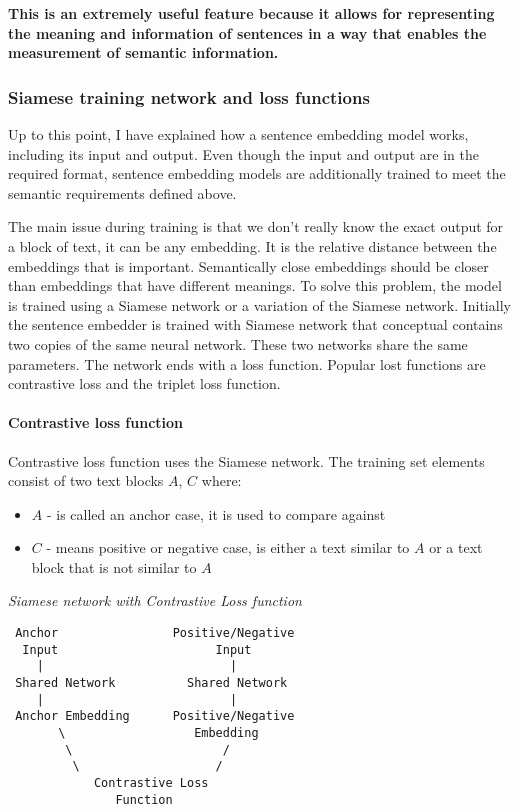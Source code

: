 \documentclass{wseas}
\begin{document}
\textbf{This is an extremely useful feature because it allows for
representing the meaning and information of sentences in a way that
enables the measurement of semantic information.}

\subsubsection{Siamese training network and loss functions}

Up to this point, I have explained how a sentence embedding model works,
including its input and output. Even though the input and output are in
the required format, sentence embedding models are additionally trained
to meet the semantic requirements defined above.

The main issue during training is that we don't really know the exact
output for a block of text, it can be any embedding. It is the relative
distance between the embeddings that is important. Semantically close
embeddings should be closer than embeddings that have different
meanings. To solve this problem, the model is trained using a Siamese
network or a variation of the Siamese network. Initially the sentence
embedder is trained with Siamese network that conceptual contains two
copies of the same neural network. These two networks share the same
parameters. The network ends with a loss function. Popular lost
functions are contrastive loss and the triplet loss function.

\paragraph{Contrastive loss function}

Contrastive loss function uses the Siamese network. The training set
elements consist of two text blocks \(A\), \(C\) where:

\begin{itemize}

\item
  \(A\) - is called an anchor case, it is used to compare against
\item
  \(C\) - means positive or negative case, is either a text similar to
  \(A\) or a text block that is not similar to \(A\)
\end{itemize}

\emph{Siamese network with Contrastive Loss function}

\begin{verbatim}
 Anchor                Positive/Negative
  Input                      Input
    |                          |
 Shared Network          Shared Network 
    |                          |
 Anchor Embedding      Positive/Negative 
       \                  Embedding
        \                     /
         \                   /
            Contrastive Loss
               Function
\end{verbatim}
\end{document}
